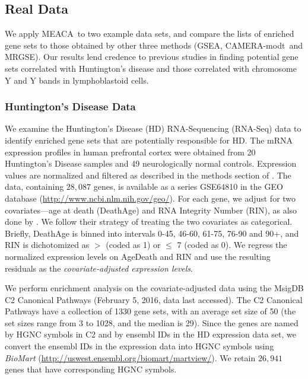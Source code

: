 \documentclass[a4,center,fleqn]{NAR}
\newcommand{\OurMethod}{MEACA}
\newcommand{\CMT}{CAMERA-modt}
\newcommand{\genr}{MRGSE}
\begin{document}
	\subsection{Real Data}\label{section:realdata}
	We apply \OurMethod~to two example data sets, and compare the lists of enriched gene sets to 
	those obtained by other three methods (GSEA, \CMT~and \genr). %
	Our results lend credence to previous studies in finding potential gene sets correlated with
	Huntington's disease and those correlated with chromosome Y and Y bands in lymphoblastoid 
	cells.  
	
	\subsubsection{Huntington's Disease Data}
	We examine the Huntington's Disease (HD) RNA-Sequencing (RNA-Seq) data 
	\citep{labadorf2015rna} to identify enriched gene sets that are potentially responsible for HD. 
	The mRNA expression profiles in human prefrontal cortex were obtained from 20 Huntington's 
	Disease samples and 49 neurologically normal controls.  Expression values are normalized and 
	filtered as described in the methods section of \citet{labadorf2015rna}. The data, containing 
	$28,087$ genes, is available as a series GSE64810 in the GEO database 
	(\url{http://www.ncbi.nlm.nih.gov/geo/}). For each gene, we adjust for two covariates---age at 
	death (DeathAge) and RNA Integrity Number (RIN), as also done by \citet{labadorf2015rna}. We 
	follow their strategy of treating the two covariates as categorical. Briefly, DeathAge is 
	binned into intervals 0-45, 46-60, 61-75, 76-90 and	90+, and RIN is dichotomized as  $>$ (coded 
	as 1) or $\leq$ 7 (coded as 0). We regress the normalized expression levels on AgeDeath and RIN 
	and use the resulting 
	residuals as the \textit{covariate-adjusted expression levels}.
	
	We perform enrichment analysis on the covariate-adjusted data using the MsigDB
	\citep{subramanian2005gene} C2 Canonical Pathways (February 5, 2016, data last accessed).
	The C2 Canonical Pathways have a collection of 1330 gene sets, with an average set size of
	50 (the set sizes range from 3 to 1028, and the median is 29). Since the genes are named by
	HGNC symbols in C2 and by ensembl IDs in the HD expression data set, we convert the ensembl 
	IDs in 	the expression data into HGNC symbols using \textit{BioMart}
	(\url{http://uswest.ensembl.org/biomart/martview/}). We retain $26,941$ genes that have
	corresponding HGNC symbols. 
	
\end{document}
